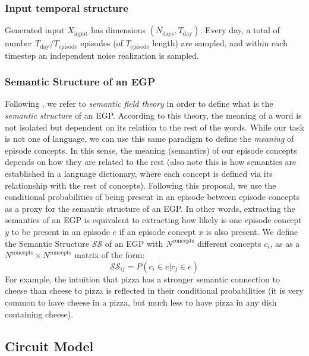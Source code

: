 \documentclass{article}
\begin{document}
\subsubsection*{Input temporal structure}
Generated input $X_\textrm{input}$ has dimensions $(N_\textrm{days}, T_\textrm{day})$. Every day, a total of number $T_\textrm{day}/T_\textrm{episode}$ episodes (of $T_\textrm{episode}$ length) are sampled, and within each timestep an independent noise realization is sampled. 
\subsubsection*{Semantic Structure of an EGP}
Following , we refer to  \textit{semantic field theory}  in order to define what is the \textit{semantic structure} of an EGP. According to this theory, the meaning of a word is not isolated but dependent on its relation to the rest of the words. While our task is not one of language, we can use this same paradigm to define the \textit{meaning} of episode concepts. In this sense, the meaning (semantics) of our episode concepts depends on how they are related to the rest (also note this is how semantics are established in a language dictionary, where each concept is defined via its relationship with the rest of concepts). 
\newline\newline
Following this proposal, we use the conditional probabilities of being present in an episode between episode concepts as a proxy for the semantic structure of an EGP. In other words, extracting the semantics of an EGP is equivalent to extracting how likely is one episode concept $y$ to be present in an episode $e$ if an episode concept $x$ is also present. We define the Semantic Structure $\mathcal{SS}$ of an EGP with $N^\textrm{concepts}$ different concepts $c_i$, as as a $N^\textrm{concepts}\times N^\textrm{concepts}$ matrix of the form:
\begin{equation}
    \mathcal{SS}_{ij} = P(c_i \in e|c_j \in e) 
    \label{eq:semantic_structure}
\end{equation}
For example, the intuition that pizza has a stronger semantic connection to cheese than cheese to pizza is reflected in their conditional probabilities (it is very common to have cheese in a pizza, but much less to have pizza in any dish containing cheese).  
\subsection*{Circuit Model}
\end{document}
